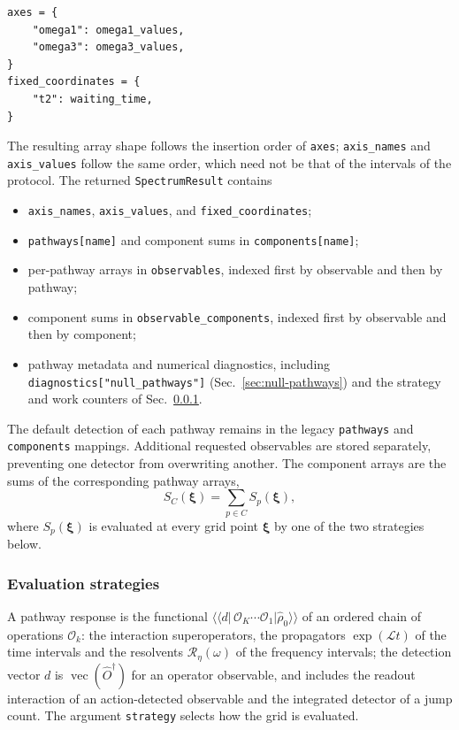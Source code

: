 \documentclass[11pt]{article}
\begin{document}
\begin{verbatim}
axes = {
    "omega1": omega1_values,
    "omega3": omega3_values,
}
fixed_coordinates = {
    "t2": waiting_time,
}
\end{verbatim}
The resulting array shape follows the insertion order of \texttt{axes}; \texttt{axis\_names} and \texttt{axis\_values} follow the same order, which need not be that of the intervals of the protocol. The returned \texttt{SpectrumResult} contains
\begin{itemize}
    \item \texttt{axis\_names}, \texttt{axis\_values}, and \texttt{fixed\_coordinates};
    \item \texttt{pathways[name]} and component sums in \texttt{components[name]};
    \item per-pathway arrays in \texttt{observables}, indexed first by observable and then by pathway;
    \item component sums in \texttt{observable\_components}, indexed first by observable and then by component;
    \item pathway metadata and numerical diagnostics, including \texttt{diagnostics["null\_pathways"]} (Sec.~\ref{sec:null-pathways}) and the strategy and work counters of Sec.~\ref{sec:strategies}.
\end{itemize}
The default detection of each pathway remains in the legacy \texttt{pathways} and \texttt{components} mappings. Additional requested observables are stored separately, preventing one detector from overwriting another.
\newline
The component arrays are the sums of the corresponding pathway arrays,
\begin{equation}
    S_C(\boldsymbol{\xi}) = \sum_{p \in C} S_p(\boldsymbol{\xi}),
\end{equation}
where $S_p(\boldsymbol{\xi})$ is evaluated at every grid point $\boldsymbol{\xi}$ by one of the two strategies below.

\subsubsection{Evaluation strategies}
\label{sec:strategies}

A pathway response is the functional $\langle\!\langle d|\,\mathcal{O}_K\cdots\mathcal{O}_1|\hat{\rho}_0\rangle\!\rangle$ of an ordered chain of operations $\mathcal{O}_k$: the interaction superoperators, the propagators $\exp(\mathcal{L}t)$ of the time intervals and the resolvents $\mathcal{R}_\eta(\omega)$ of the frequency intervals; the detection vector $d$ is $\operatorname{vec}(\hat O^\dagger)$ for an operator observable, and includes the readout interaction of an action-detected observable and the integrated detector of a jump count. The argument \texttt{strategy} selects how the grid is evaluated.
\end{document}

